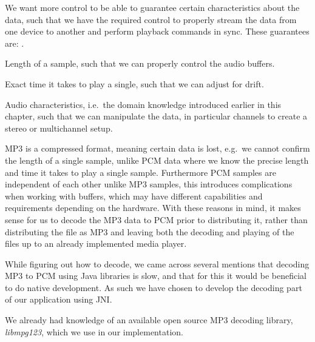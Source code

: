 We want more control to be able to guarantee certain characteristics about the data, such that we have the required control to properly stream the data from one device to another and perform playback commands in sync.
These guarantees are: .
\begin{eletterate*}
    \item Length of a sample, such that we can properly control the audio buffers.
    \item Exact time it takes to play a single, such that we can adjust for drift.
    \item Audio characteristics, i.e.\ the domain knowledge introduced earlier in this chapter, such that we can manipulate the data, in particular channels to create a stereo or multichannel setup.
\end{eletterate*}

MP3 is a compressed format, meaning certain data is lost, e.g.\ we cannot confirm the length of a single sample, unlike \ac{PCM} data where we know the precise length and time it takes to play a single sample.
Furthermore \ac{PCM} samples are independent of each other unlike MP3 samples, this introduces complications when working with buffers, which may have different capabilities and requirements depending on the hardware.
With these reasons in mind, it makes sense for us to decode the MP3 data to \ac{PCM} prior to distributing it, rather than distributing the file as MP3 and leaving both the decoding and playing of the files up to an already implemented media player.

\bigskip
While figuring out how to decode, we came across several mentions that decoding MP3 to \ac{PCM} using Java libraries is slow, and that for this it would be beneficial to do native development\cite{slow_java_stackoverflow}\cite{slow_java_lib}.
As such we have chosen to develop the decoding part of our application using \ac{JNI}\@.

We already had knowledge of an available open source MP3 decoding library, \textit{libmpg123}, which we use in our implementation.

